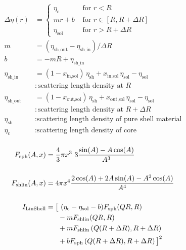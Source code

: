 \begin{align}
\Delta\eta(r)      & =
\begin{cases}
\eta_\text{c} & \text{~for~} r<R \\
m r + b  & \text{~for~} r \in [R,R+\Delta R] \\
\eta_\text{sol}  & \text{~for~} r>R+\Delta R
\end{cases}\\
m           & = (\eta_\text{sh\_out}-\eta_\text{sh\_in}) / \Delta R \\
b           & = -m R + \eta_\text{sh\_in} \\
\eta_\text{sh\_in}  & = (1 - x_\text{in,sol})  \, \eta_\text{sh} + x_\text{in,sol} \,\eta_\text{sol}-\eta_\text{sol} \\
                    & : \text{scattering length density at $R$} \nonumber \\
\eta_\text{sh\_out} & = (1 - x_\text{out,sol}) \, \eta_\text{sh} + x_\text{out,sol}\,\eta_\text{sol}-\eta_\text{sol} \\
                    & : \text{scattering length density at $R+\Delta R$} \nonumber \\
\eta_\text{sh}      & : \text{scattering length density of pure shell material} \nonumber \\
\eta_\text{c}       & : \text{scattering length density of core} \nonumber \\
\nonumber
\end{align}

\begin{align}
F_\text{sph}(A,x) & = \frac{4}{3}\pi x^3 \,\, 3\frac{\sin(A)-A\cos(A)}{A^3} \\[5mm]
F_\text{shlin}(A,x) & = 4\pi x^4 \frac{2\cos(A)+2A\sin(A)-A^2\cos(A)}{A^4} \\[5mm]
I_\text{LinShell}    & = \big[ \,\, (\eta_\text{c}-\eta_\text{sol}-b)F_\text{sph}(QR,R) \nonumber \\
             & \hspace{6mm} - mF_\text{shlin}(QR,R) \\
             & \hspace{6mm} + mF_\text{shlin}\left(Q(R+\Delta R),R+\Delta R\right) \nonumber \\
             & \hspace{6mm} + bF_\text{sph}\left(Q(R+\Delta R),R+\Delta R\right) \big]^2 \nonumber
\end{align}

\vspace{5mm}

